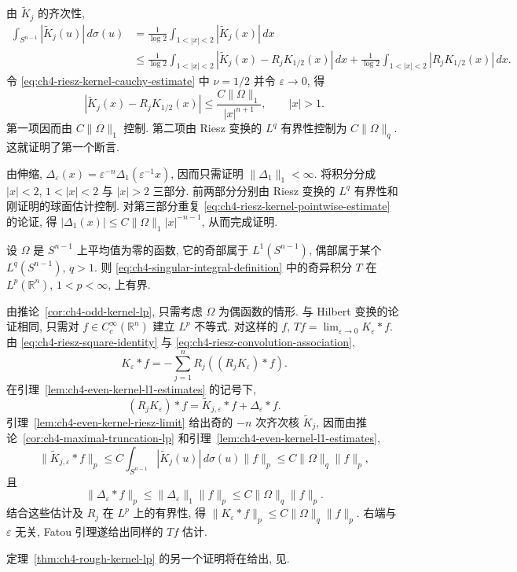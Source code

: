 \begin{Proof}
由 $\widetilde K_j$ 的齐次性,
\[
\begin{aligned}
 \int_{S^{n-1}}|\widetilde K_j(u)|\,d\sigma(u)
 &=\frac1{\log2}\int_{1<|x|<2}|\widetilde K_j(x)|\,dx\\
 &\le\frac1{\log2}\int_{1<|x|<2}
 |\widetilde K_j(x)-R_jK_{1/2}(x)|\,dx
 +\frac1{\log2}\int_{1<|x|<2}|R_jK_{1/2}(x)|\,dx.
\end{aligned}
\]
令 \eqref{eq:ch4-riesz-kernel-cauchy-estimate} 中 $\nu=1/2$ 并令 $\varepsilon\to0$, 得
\begin{equation}
\label{eq:ch4-riesz-kernel-pointwise-estimate}
 |\widetilde K_j(x)-R_jK_{1/2}(x)|
 \le\frac{C\|\Omega\|_1}{|x|^{n+1}},
 \qquad |x|>1.
\end{equation}
第一项因而由 $C\|\Omega\|_1$ 控制. 第二项由 Riesz 变换的 $L^q$ 有界性控制为 $C\|\Omega\|_q$. 这就证明了第一个断言.

由伸缩, $\Delta_\varepsilon(x)=\varepsilon^{-n}\Delta_1(\varepsilon^{-1}x)$, 因而只需证明 $\|\Delta_1\|_1<\infty$. 将积分分成 $|x|<2$, $1<|x|<2$ 与 $|x|>2$ 三部分. 前两部分分别由 Riesz 变换的 $L^q$ 有界性和刚证明的球面估计控制. 对第三部分重复 \eqref{eq:ch4-riesz-kernel-pointwise-estimate} 的论证, 得 $|\Delta_1(x)|\le C\|\Omega\|_1|x|^{-n-1}$, 从而完成证明.
\end{Proof}

\hypertarget{chapter-04-page-091}{}
\begin{Theorem}
\label{thm:ch4-rough-kernel-lp}
设 $\Omega$ 是 $S^{n-1}$ 上平均值为零的函数, 它的奇部属于 $L^1(S^{n-1})$, 偶部属于某个 $L^q(S^{n-1})$, $q>1$. 则 \eqref{eq:ch4-singular-integral-definition} 中的奇异积分 $T$ 在 $L^p(\mathbb R^n)$, $1<p<\infty$, 上有界.
\end{Theorem}

\begin{Proof}
由推论~\ref{cor:ch4-odd-kernel-lp}, 只需考虑 $\Omega$ 为偶函数的情形. 与 Hilbert 变换的论证相同, 只需对 $f\in C_c^\infty(\mathbb R^n)$ 建立 $L^p$ 不等式. 对这样的 $f$, $Tf=\lim_{\varepsilon\to0}K_\varepsilon*f$. 由 \eqref{eq:ch4-riesz-square-identity} 与 \eqref{eq:ch4-riesz-convolution-association},
\[
 K_\varepsilon*f=-\sum_{j=1}^nR_j((R_jK_\varepsilon)*f).
\]
在引理~\ref{lem:ch4-even-kernel-l1-estimates} 的记号下,
\[
 (R_jK_\varepsilon)*f=\widetilde K_{j,\varepsilon}*f+\Delta_\varepsilon*f.
\]
引理~\ref{lem:ch4-even-kernel-riesz-limit} 给出奇的 $-n$ 次齐次核 $\widetilde K_j$, 因而由推论~\ref{cor:ch4-maximal-truncation-lp} 和引理~\ref{lem:ch4-even-kernel-l1-estimates},
\[
 \|\widetilde K_{j,\varepsilon}*f\|_p
 \le C\int_{S^{n-1}}|\widetilde K_j(u)|\,d\sigma(u)\|f\|_p
 \le C\|\Omega\|_q\|f\|_p,
\]
且
\[
 \|\Delta_\varepsilon*f\|_p
 \le\|\Delta_\varepsilon\|_1\|f\|_p
 \le C\|\Omega\|_q\|f\|_p.
\]
结合这些估计及 $R_j$ 在 $L^p$ 上的有界性, 得 $\|K_\varepsilon*f\|_p\le C\|\Omega\|_q\|f\|_p$. 右端与 $\varepsilon$ 无关, Fatou 引理遂给出同样的 $Tf$ 估计.
\end{Proof}

\hypertarget{chapter-04-page-092}{}
定理~\ref{thm:ch4-rough-kernel-lp} 的另一个证明将在给出, 见.
